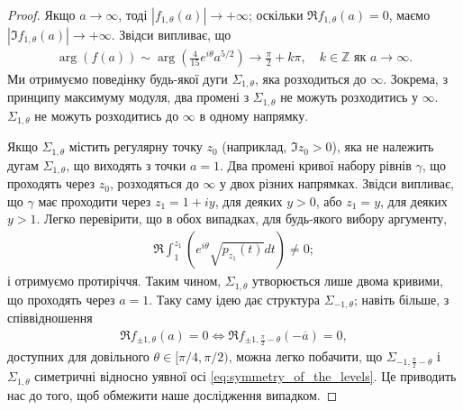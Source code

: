 \documentclass{article}
\begin{document}
\begin{proof}
Якщо $ a \to \infty $, тоді $ |f_{1,\theta}(a)| \to +\infty $; оскільки $ \Re f_{1,\theta}(a) = 0 $, маємо $ |\Im f_{1,\theta}(a)| \to +\infty $. Звідси випливає, що
\begin{align*}
    \arg (f(a)) \sim \arg \left( \frac{4}{15} e^{i\theta} a^{5/2} \right) \to \frac{\pi}{2} + k\pi, \quad k \in \mathbb{Z} \text{ як } a \to \infty.
\end{align*}
Ми отримуємо поведінку будь-якої дуги $ \Sigma_{1,\theta} $, яка розходиться до $ \infty $. Зокрема, з принципу максимуму модуля, два промені з $ \Sigma_{1,\theta} $ не можуть розходитись у $ \infty $. $ \Sigma_{1,\theta} $ не можуть розходитись до $ \infty $ в одному напрямку.

Якщо $ \Sigma_{1,\theta} $ містить регулярну точку $ z_0 $ (наприклад, $ \Im z_0 > 0 $), яка не належить дугам $ \Sigma_{1,\theta} $, що виходять з точки $ a = 1 $. Два промені кривої набору рівнів $ \gamma $, що проходять через $ z_0 $, розходяться до $ \infty $ у двох різних напрямках. Звідси випливає, що $ \gamma $ має проходити через $ z_1 = 1 + iy $, для деяких $ y > 0 $, або $ z_1 = y $, для деяких $ y > 1 $. Легко перевірити, що в обох випадках, для будь-якого вибору аргументу,
\begin{align*}
    \Re \int_1^{z_1} \left( e^{i\theta} \sqrt{p_{z_1}(t)} dt \right) \neq 0;
\end{align*}
і отримуємо протиріччя. Таким чином, $ \Sigma_{1,\theta} $ утворюється лише двома кривими, що проходять через $ a = 1 $. Таку саму ідею дає структура $ \Sigma_{-1,\theta} $; навіть більше, з співвідношення
\begin{align}\label{eq:symmetry_of_the_levels}
    \Re f_{\pm1,\theta}(a) = 0 \iff \Re f_{\pm1,\frac{\pi}{2}-\theta}(-\overline{a}) = 0,
\end{align}
доступних для довільного $ \theta \in [\pi/4, \pi/2) $, можна легко побачити, що $ \Sigma_{-1,\frac{\pi}{2}-\theta} $ і $ \Sigma_{1,\theta} $ симетричні відносно уявної осі \eqref{eq:symmetry_of_the_levels}. Це приводить нас до того, щоб обмежити наше дослідження випадком.
\end{proof}
\end{document}
